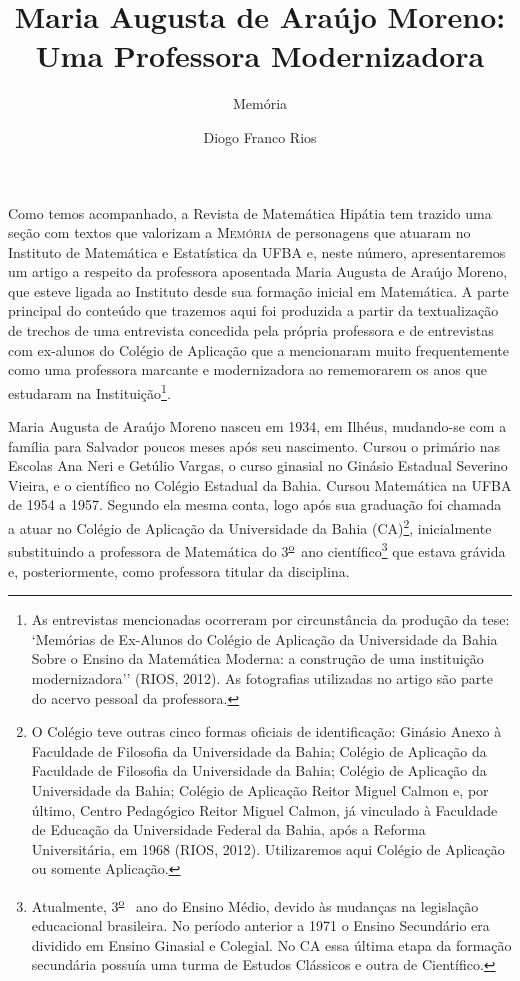 \documentclass{hipatia}
\title{\fontsize{28}{28}\selectfont Maria Augusta de Araújo Moreno:\\
\fontsize{28}{28}\selectfont Uma Professora Modernizadora}
\subtitle{Memória}
\author{Diogo Franco Rios}
\newcommand{\superou}{\textsuperscript{\underline{o}}~}
\begin{document}
\setcounter{page}{\memoriapage}
\maketitle


Como temos acompanhado, a Revista de Matemática Hipátia tem trazido uma
seção com textos que valorizam a \textsc{Memória} de personagens que atuaram no
Instituto de Matemática e Estatística da UFBA e, neste número,
apresentaremos um artigo a respeito da professora aposentada Maria
Augusta de Araújo Moreno, que esteve ligada ao Instituto desde sua
formação inicial em Matemática. A parte principal do conteúdo que
trazemos aqui foi produzida a partir da textualização de trechos de uma
entrevista concedida pela própria professora e de entrevistas com
ex-alunos do Colégio de Aplicação que a mencionaram muito frequentemente
como uma professora marcante e modernizadora ao rememorarem os anos que
estudaram na Instituição\footnote{As entrevistas mencionadas ocorreram
  por circunstância da produção da tese: `Memórias de Ex-Alunos do
  Colégio de Aplicação da Universidade da Bahia Sobre o Ensino da
  Matemática Moderna: a construção de uma instituição modernizadora''
  (RIOS, 2012). As fotografias utilizadas no artigo são parte
do acervo pessoal da professora.}.


Maria Augusta de Araújo Moreno nasceu em 1934, em Ilhéus, mudando-se com
a família para Salvador poucos meses após seu nascimento. Cursou o
primário nas Escolas Ana Neri e Getúlio Vargas, o curso ginasial no
Ginásio Estadual Severino Vieira, e o científico no Colégio Estadual da
Bahia. Cursou Matemática na UFBA de 1954 a 1957. Segundo ela mesma
conta, logo após sua graduação foi chamada a atuar no Colégio de
Aplicação da Universidade da Bahia (CA)\footnote{O Colégio teve outras
  cinco formas oficiais de identificação: Ginásio Anexo à Faculdade de
  Filosofia da Universidade da Bahia; Colégio de Aplicação da Faculdade
  de Filosofia da Universidade da Bahia; Colégio de Aplicação da
  Universidade da Bahia; Colégio de Aplicação Reitor Miguel Calmon e,
  por último, Centro Pedagógico Reitor Miguel Calmon, já vinculado à
  Faculdade de Educação da Universidade Federal da Bahia, após a Reforma
  Universitária, em 1968 (RIOS, 2012). Utilizaremos aqui Colégio de
  Aplicação ou somente Aplicação.}, inicialmente substituindo a
professora de Matemática do 3\superou  ano científico\footnote{Atualmente, 3\superou 
  ano do Ensino Médio, devido às mudanças na legislação educacional
  brasileira. No período anterior a 1971 o Ensino Secundário era
  dividido em Ensino Ginasial e Colegial. No CA essa última etapa da
  formação secundária possuía uma turma de Estudos Clássicos e outra de
  Científico.} que estava grávida e, posteriormente, como professora
titular da disciplina.
\end{document}
